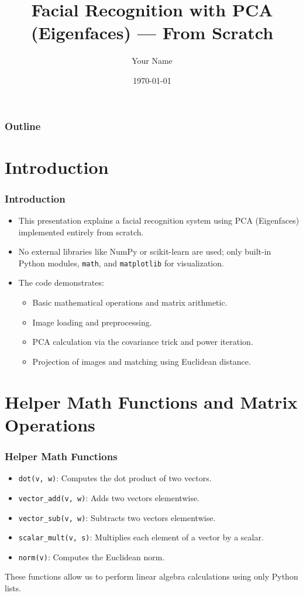 \documentclass{beamer}
\title{Facial Recognition with PCA (Eigenfaces) --- From Scratch}
\author{Your Name}
\institute{Your Institution}
\date{\today}
\begin{document}
\begin{frame}
  \titlepage
\end{frame}

\begin{frame}
  \frametitle{Outline}
  \tableofcontents
\end{frame}

\section{Introduction}

\begin{frame}
  \frametitle{Introduction}
  \begin{itemize}
    \item This presentation explains a facial recognition system using PCA (Eigenfaces) implemented entirely from scratch.
    \item No external libraries like NumPy or scikit-learn are used; only built-in Python modules, \texttt{math}, and \texttt{matplotlib} for visualization.
    \item The code demonstrates:
      \begin{itemize}
        \item Basic mathematical operations and matrix arithmetic.
        \item Image loading and preprocessing.
        \item PCA calculation via the covariance trick and power iteration.
        \item Projection of images and matching using Euclidean distance.
      \end{itemize}
  \end{itemize}
\end{frame}

\section{Helper Math Functions and Matrix Operations}

\begin{frame}[fragile]
  \frametitle{Helper Math Functions}
  \begin{itemize}
    \item \texttt{dot(v, w)}: Computes the dot product of two vectors.
    \item \texttt{vector\_add(v, w)}: Adds two vectors elementwise.
    \item \texttt{vector\_sub(v, w)}: Subtracts two vectors elementwise.
    \item \texttt{scalar\_mult(v, s)}: Multiplies each element of a vector by a scalar.
    \item \texttt{norm(v)}: Computes the Euclidean norm.
  \end{itemize}
  \vspace{5mm}
  These functions allow us to perform linear algebra calculations using only Python lists.
\end{frame}
\end{document}
